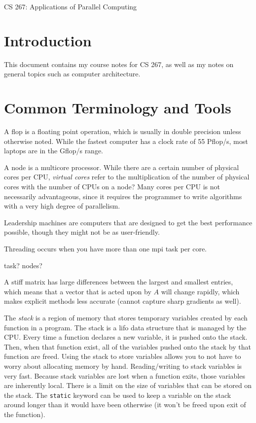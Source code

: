 \documentclass[10pt]{article}
\begin{document}
\begin{centering}
\Large CS 267: Applications of Parallel Computing\\
\end{centering}

\tableofcontents
\clearpage

\section{Introduction}
\begin{flushleft}\justify

This document contains my course notes for CS 267, as well as my notes on general topics such as computer architecture.

\section{Common Terminology and Tools}

A flop is a floating point operation, which is usually in double precision unless otherwise noted. While the fastest computer has a clock rate of 55 Pflop/s, most laptops are in the Gflop/s range. 

A node is a multicore processor. While there are a certain number of physical cores per CPU, \textit{virtual cores} refer to the multiplication of the number of physical cores with the number of CPUs on a node? Many cores per CPU is not necessarily advantageous, since it requires the programmer to write algorithms with a very high degree of parallelism.

Leadership machines are computers that are designed to get the best performance possible, though they might not be as user-friendly.

Threading occurs when you have more than one \gls{mpi} task per core. 

task? 
nodes?

A stiff matrix has large differences between the largest and smallest entries, which means that a vector that is acted upon by \(A\) will change rapidly, which makes explicit methods less accurate (cannot capture sharp gradients as well). 

The \textit{stack} is a region of memory that stores temporary variables created by each function in a program. The stack is a \gls{lifo} data structure that is managed by the CPU. Every time a function declares a new variable, it is pushed onto the stack. Then, when that function exist, all of the variables pushed onto the stack by that function are freed. Using the stack to store variables allows you to not have to worry about allocating memory by hand. Reading/writing to stack variables is very fast. Because stack variables are lost when a function exits, those variables are inherently local. There is a limit on the size of variables that can be stored on the stack. The {\tt static} keyword can be used to keep a variable on the stack around longer than it would have been otherwise (it won't be freed upon exit of the function). 


\end{flushleft}
\end{document}
